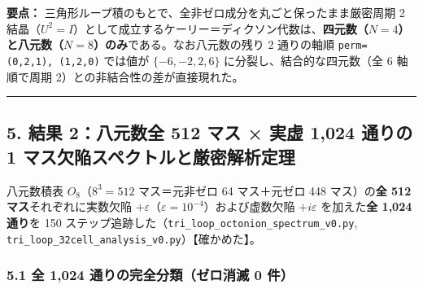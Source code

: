 \documentclass[
  a4paper,
]{ltjsarticle}
\begin{document}
\textbf{要点：}
三角形ループ積のもとで、全非ゼロ成分を丸ごと保ったまま厳密周期 2
結晶（\(U^2 = I\)）として成立するケーリー＝ディクソン代数は、\textbf{四元数（\(N=4\)）と八元数（\(N=8\)）のみ}である。なお八元数の残り
2 通りの軸順 \texttt{perm=(0,2,1),\ (1,2,0)} では値が
\(\{-6, -2, 2, 6\}\) に分裂し、結合的な四元数（全 6 軸順で周期
2）との非結合性の差が直接現れた。

\begin{center}\rule{0.5\linewidth}{0.5pt}\end{center}

\subsection{5. 結果 2：八元数全 512 マス × 実虚 1,024 通りの 1
マス欠陥スペクトルと厳密解析定理}\label{ux7d50ux679c-2ux516bux5143ux6570ux5168-512-ux30deux30b9-ux5b9fux865a-1024-ux901aux308aux306e-1-ux30deux30b9ux6b20ux9665ux30b9ux30daux30afux30c8ux30ebux3068ux53b3ux5bc6ux89e3ux6790ux5b9aux7406}

八元数積表 \(O_8\)（\(8^3 = 512\) マス＝元非ゼロ 64 マス＋元ゼロ 448
マス）の\textbf{全 512 マス}それぞれに実数欠陥
\(+\varepsilon\)（\(\varepsilon = 10^{-4}\)）および虚数欠陥
\(+i\varepsilon\) を加えた\textbf{全 1,024 通り}を 150
ステップ追跡した（\texttt{tri\_\allowbreak{}loop\_\allowbreak{}octonion\_\allowbreak{}spectrum\_\allowbreak{}v0.py},
\texttt{tri\_\allowbreak{}loop\_\allowbreak{}32cell\_\allowbreak{}analysis\_\allowbreak{}v0.py}）【確かめた】。

\subsubsection{5.1 全 1,024 通りの完全分類（ゼロ消滅 0
件）}\label{ux5168-1024-ux901aux308aux306eux5b8cux5168ux5206ux985eux30bcux30edux6d88ux6ec5-0-ux4ef6}
\end{document}
